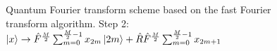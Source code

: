 \begin{figure}
\centering



\caption{Quantum Fourier transform scheme based on the fast Fourier transform algorithm. Step 2: 
$\ket{x} \rightarrow
\hat{F}^{\frac{M}{2}} \sum_{m = 0}^{\frac{M}{2} - 1}x_{2m} \ket{2m} +
\hat{R}\hat{F}^{\frac{M}{2}} \sum_{m = 0}^{\frac{M}{2} - 1} x_{2m + 1}$}
\label{figQuantCompQuantFourier2}
\end{figure}